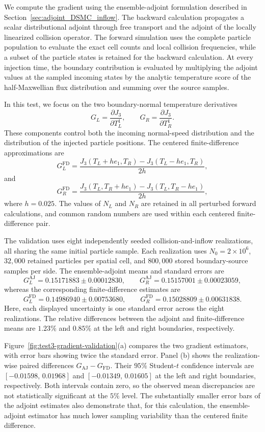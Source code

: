 \documentclass[12pt,nopreprintline]{elsarticle}
\begin{document}
{We compute the gradient using the ensemble-adjoint formulation described in Section~\ref{sec:adjoint_DSMC_inflow}. The backward calculation propagates a scalar distributional adjoint through free transport and the adjoint of the locally linearized collision operator. The forward simulation uses the complete particle population to evaluate the exact cell counts and local collision frequencies, while a subset of the particle states is retained for the backward calculation. At every injection time, the boundary contribution is evaluated by multiplying the adjoint values at the sampled incoming states by the analytic temperature score of the half-Maxwellian flux distribution and summing over the source samples.

In this test, we focus on the two boundary-normal temperature derivatives
\[
G_L=\frac{\partial J_3}{\partial T_L^1},
\qquad
G_R=\frac{\partial J_3}{\partial T_R^1}.
\]
These components control both the incoming normal-speed distribution and the distribution of the injected particle positions. The centered finite-difference approximations are
\[
G_L^{\mathrm{FD}} =
\frac{
J_3(T_L+h e_1,T_R)-J_3(T_L-h e_1,T_R)
}{2h},
\]
and
\[
G_R^{\mathrm{FD}} =
\frac{
J_3(T_L,T_R+h e_1)-J_3(T_L,T_R-h e_1)
}{2h},
\]
where $h=0.025$. The values of $N_L$ and $N_R$ are retained in all perturbed forward calculations, and common random numbers are used within each centered finite-difference pair.

The validation uses eight independently seeded collision-and-inflow realizations, all sharing the same initial particle sample. Each realization uses $N_0=2\times10^6$, $32{,}000$ retained particles per spatial cell, and $800{,}000$ stored boundary-source samples per side. The ensemble-adjoint means and standard errors are
\[
G_L^{\mathrm{AJ}} = 0.15171883\pm0.00012830,
\qquad
G_R^{\mathrm{AJ}} = 0.15157001\pm0.00023059,
\]
whereas the corresponding finite-difference estimates are
\[
G_L^{\mathrm{FD}} = 0.14986940\pm0.00753680,
\qquad
G_R^{\mathrm{FD}} = 0.15028809\pm0.00631838.
\]
Here, each displayed uncertainty is one standard error across the eight realizations. The relative differences between the adjoint and finite-difference means are $1.23\%$ and $0.85\%$ at the left and right boundaries, respectively.

Figure~\ref{fig:test3-gradient-validation}(a) compares the two gradient estimators, with error bars showing twice the standard error. Panel (b) shows the realization-wise paired differences $G_{\mathrm{AJ}}-G_{\mathrm{FD}}$. Their $95\%$ Student-$t$ confidence intervals are $ [-0.01598,\,0.01968]$ and $ [-0.01349,\,0.01605]$ at the left and right boundaries, respectively. Both intervals contain zero, so the observed mean discrepancies are not statistically significant at the $5\%$ level. The substantially smaller error bars of the adjoint estimates also demonstrate that, for this calculation, the ensemble-adjoint estimator has much lower sampling variability than the centered finite difference.

}
\end{document}
